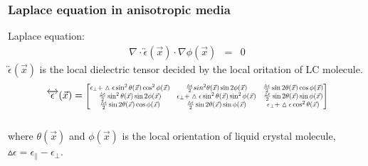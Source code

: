 \documentclass{beamer}
\newcommand\scalemath[2]{\scalebox{#1}{\mbox{\ensuremath{\displaystyle #2}}}} %
\begin{document}
\begin{frame}
\frametitle{Laplace equation in anisotropic media}
Laplace equation:
\begin{eqnarray}
\nabla \cdot \overleftrightarrow{\epsilon}(\vec x) \cdot \nabla \phi(\vec x) &=& 0 \nonumber
\label{eq:laplace}
\end{eqnarray}
$\overleftrightarrow{\epsilon}(\vec x)$ is the local dielectric tensor decided by the local oritation of LC molecule. 
\\
\begin{eqnarray}
\overleftrightarrow{\epsilon}(\vec x) = 
\scalemath{0.7}{
\begin{bmatrix}
\epsilon_{\perp}+\vartriangle\epsilon \sin^2\theta(\vec{x})\cos^2\phi(\vec{x}) & \frac{\vartriangle\epsilon}{2} sin^2\theta(\vec{x})\sin 2\phi(\vec{x}) & \frac{\vartriangle\epsilon}{2} \sin 2\theta(\vec{x})\cos\phi(\vec{x}) \\
\frac{\vartriangle\epsilon}{2} \sin^2\theta(\vec{x})\sin 2\phi(\vec{x}) & \epsilon_{\perp}+\vartriangle\epsilon \sin^2\theta(\vec{x})\sin^2\phi(\vec{x}) & \frac{\vartriangle\epsilon}{2} \sin 2\theta(\vec{x})\sin\phi(\vec{x}) \\
\frac{\vartriangle\epsilon}{2} \sin 2\theta(\vec{x})\cos\phi(\vec{x}) & \frac{\vartriangle\epsilon}{2} \sin 2\theta(\vec{x})\sin\phi(\vec{x}) & \epsilon_{\perp}+\vartriangle\epsilon \cos^2\theta(\vec{x})\\ 
\end{bmatrix}}
\nonumber
\label{eq:dielectric_tensor}
\end{eqnarray}
\\
where $\theta(\vec{x})$ and $\phi(\vec{x})$ is the local orientation of liquid crystal molecule, $\vartriangle\epsilon = \epsilon_{\parallel}-\epsilon_{\perp}$.
\end{frame}
\end{document}
